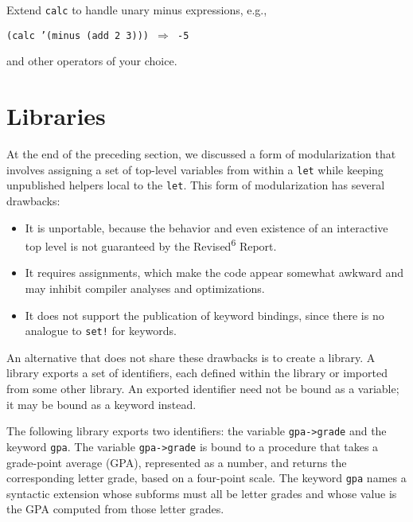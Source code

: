 \label{further_s89}Extend \texttt{calc} to handle unary minus expressions, e.g.,


\texttt{(calc '(minus (add 2 3))) \(\Rightarrow\) -5}

and other operators of your choice.




\section{\label{further_g84}\label{further_h6}Libraries\label{further_SECTGFLIBRARIES}}



At the end of the preceding section, we discussed a form of modularization
that involves assigning a set of top-level variables from within a \texttt{let}
while keeping unpublished helpers local to the \texttt{let}.
This form of modularization has several drawbacks:

\begin{itemize}
  \item 
It is unportable, because the behavior and even existence of an
        interactive top level is not guaranteed by the Revised\textsuperscript{6} Report.
  \item It requires assignments, which make the code appear somewhat awkward
        and may inhibit compiler analyses and optimizations.
  \item It does not support the publication of keyword bindings, since
        there is no analogue to \texttt{set!} for keywords.

\end{itemize}


An alternative that does not share these drawbacks is to create a library.
A library exports a set of identifiers, each defined within the library
or imported from some other library.
An exported identifier need not be bound as a variable; it may be bound
as a keyword instead.


The following library exports two identifiers: the variable
\texttt{gpa-\textgreater{}grade} and the keyword \texttt{gpa}.
The variable \texttt{gpa-\textgreater{}grade} is bound to a procedure that
takes a grade-point average (GPA), represented as a number, and returns
the corresponding letter grade, based on a four-point scale.
The keyword \texttt{gpa} names a syntactic extension whose
subforms must all be letter grades and whose value is the GPA
computed from those letter grades.


